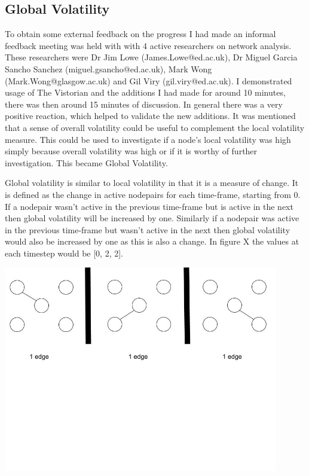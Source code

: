 \subsection{Global Volatility}

To obtain some external feedback on the progress I had made an informal feedback meeting was held with with 4 active researchers on network analysis. These researchers were Dr Jim Lowe (James.Lowe@ed.ac.uk), Dr Miguel Garcia Sancho Sanchez (miguel.gsancho@ed.ac.uk), Mark Wong (Mark.Wong@glasgow.ac.uk) and Gil Viry (gil.viry@ed.ac.uk). I demonstrated usage of The Vistorian and the additions I had made for around 10 minutes, there was then around 15 minutes of discussion. In general there was a very positive reaction, which helped to validate the new additions. It was mentioned that a sense of overall volatility could be useful to complement the local volatility measure. This could be used to investigate if a node's local volatility was high simply because overall volatility was high or if it is worthy of further investigation. This became Global Volatility.

Global volatility is similar to local volatility in that it is a measure of change. It is defined as the change in active nodepairs for each time-frame, starting from 0. If a nodepair wasn't active in the previous time-frame but is active in the next then global volatility will be increased by one. Similarly if a nodepair was active in the previous time-frame but wasn't active in the next then global volatility would also be increased by one as this is also a change. In figure X the values at each timestep would be [0, 2, 2].

\begin{center}
\includegraphics[trim={0 10cm 0 -1cm}, width=120mm]{./Figures/volatility3.jpg}
\end{center}



